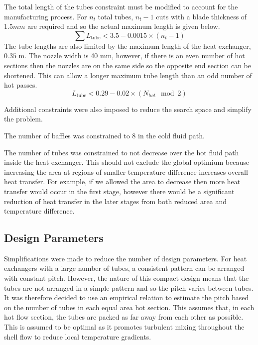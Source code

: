 \documentclass{article}
\begin{document}
The total length of the tubes constraint must be modified to account for the manufacturing process.
For $n_t$ total tubes, $n_t - 1$ cuts with a blade thickness of $1.5 mm$ are required and so the actual maximum length is given below.
\begin{equation}
  \sum L_\text{tube} < 3.5 - 0.0015 \times (n_t - 1)
\end{equation}
The tube lengths are also limited by the maximum length of the heat exchanger, $0.35$ m.
The nozzle width is 40 mm, however, if there is an even number of hot sections then the nozzles are on the same side so the opposite end section can be shortened.
This can allow a longer maximum tube length than an odd number of hot passes.
\begin{equation}
  L_\text{tube} < 0.29 - 0.02 \times ( N_{hot}\mod 2)
\end{equation}

Additional constraints were also imposed to reduce the search space and simplify the problem.

The number of baffles was constrained to 8 in the cold fluid path. %

The number of tubes was constrained to not decrease over the hot fluid path inside the heat exchanger.
This should not exclude the global optimium because increasing the area at regions of smaller temperature difference increases overall heat transfer.
For example, if we allowed the area to decrease then more heat transfer would occur in the first stage,
however there would be a significant reduction of heat transfer in the later stages from both reduced area and temperature difference.

\subsection{Design Parameters}

Simplifications were made to reduce the number of design parameters.
For heat exchangers with a large number of tubes, a consistent pattern can be arranged with constant pitch.
However, the nature of this compact design means that the tubes are not arranged in a simple pattern and so the pitch varies between tubes.
It was therefore decided to use an empirical relation to estimate the pitch based on the number of tubes in each equal area hot section.
This assumes that, in each hot flow section, the tubes are packed as far away from each other as possible.
This is assumed to be optimal as it promotes turbulent mixing throughout the shell flow to reduce local temperature gradients.
\end{document}
